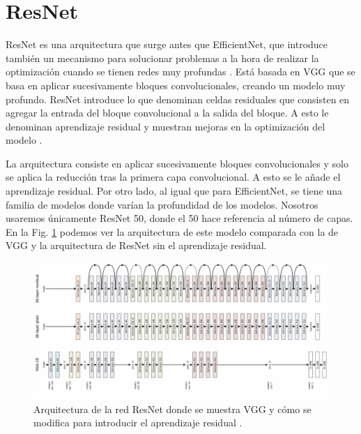 \documentclass[a4paper,12pt,oneside,titlepage]{book}
\begin{document}
\section*{ResNet}

ResNet es una arquitectura que surge antes que EfficientNet, que introduce también un mecanismo para solucionar problemas a la hora de realizar la optimización cuando se tienen redes muy profundas \cite{resnet}. Está basada en VGG \cite{vgg} que se basa en aplicar sucesivamente bloques convolucionales, creando un modelo muy profundo. ResNet introduce lo que denominan celdas residuales que consisten en agregar la entrada del bloque convolucional a la salida del bloque. A esto le denominan aprendizaje residual y muestran mejoras en la optimización del modelo \cite{resnet}.
 
La arquitectura consiste en aplicar sucesivamente bloques convolucionales y solo se aplica la reducción tras la primera capa convolucional. A esto se le añade el aprendizaje residual. Por otro lado, al igual que para EfficientNet, se tiene una familia de modelos donde varían la profundidad de los modelos. Nosotros usaremos únicamente ResNet 50, donde el 50 hace referencia al número de capas. En la Fig. \ref{fig:resnet} podemos ver la arquitectura de este modelo comparada con la de VGG y la arquitectura de ResNet sin el aprendizaje residual.


\begin{figure}[h!]
  \centering
  \includegraphics[scale=1.0, center]{resnet50.png}
  \caption{Arquitectura de la red ResNet donde se muestra VGG y cómo se modifica para introducir el aprendizaje residual \cite{resnet}.}
  \label{fig:resnet}
\end{figure}

\end{document}
